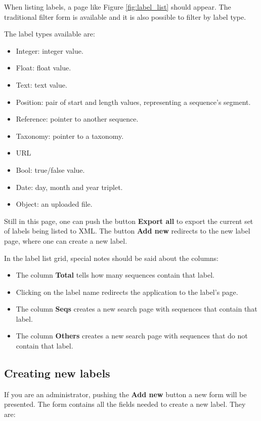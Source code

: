 When listing labels, a page like Figure \ref{fig:label_list} should appear. The traditional
filter form is available and it is also possible to filter by label type.

The label types available are:
\begin{itemize}
  \item Integer: integer value.
  \item Float: float value.
  \item Text: text value.
  \item Position: pair of start and length values, representing a sequence's segment.
  \item Reference: pointer to another sequence.
  \item Taxonomy: pointer to a taxonomy.
  \item URL
  \item Bool: true/false value.
  \item Date: day, month and year triplet.
  \item Object: an uploaded file.
\end{itemize}

Still in this page, one can push the button \textbf{Export all} to export the current set of
labels being listed to XML. The button \textbf{Add new} redirects to the new label page, where one can
create a new label.

In the label list grid, special notes should be said about the columns:

\begin{itemize}
  \item The column \textbf{Total} tells how many sequences contain that label.
  \item Clicking on the label name redirects the application to the label's page.
  \item The column \textbf{Seqs} creates a new search page with sequences that contain that label.
  \item The column \textbf{Others} creates a new search page with sequences that do not contain that label.
\end{itemize}

\subsection{Creating new labels}

If you are an administrator, pushing the \textbf{Add new} button a new form will be presented.
The form contains all the fields needed to create a new label. They are:


